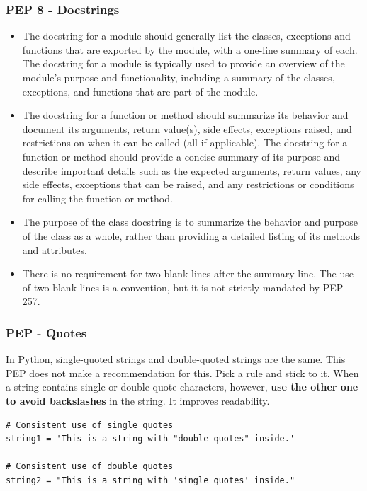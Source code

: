 \subsubsection{PEP 8 - Docstrings}
\begin{itemize}
\item The docstring for a module should generally list the classes, exceptions and functions that are exported by the module, with a one-line summary of each. The docstring for a module is typically used to provide an overview of the module's purpose and functionality, including a summary of the classes, exceptions, and functions that are part of the module.

\item The docstring for a function or method should summarize its behavior and document its arguments, return value(s), side effects, exceptions raised, and restrictions on when it can be called (all if applicable). The docstring for a function or method should provide a concise summary of its purpose and describe important details such as the expected arguments, return values, any side effects, exceptions that can be raised, and any restrictions or conditions for calling the function or method.

\item The purpose of the class docstring is to summarize the behavior and purpose of the class as a whole, rather than providing a detailed listing of its methods and attributes.

\item There is no requirement for two blank lines after the summary line. The use of two blank lines is a convention, but it is not strictly mandated by PEP 257.
\end{itemize}

\subsubsection{PEP - Quotes}
In Python, single-quoted strings and double-quoted strings are the same. This PEP does not make a recommendation for this. Pick a rule and stick to it. When a string contains single or double quote characters, however, \textbf{use the other one to avoid backslashes} in the string. It improves readability.

\begin{codebox}
\begin{verbatim}
# Consistent use of single quotes
string1 = 'This is a string with "double quotes" inside.'

# Consistent use of double quotes
string2 = "This is a string with 'single quotes' inside."
\end{verbatim}
\end{codebox}

